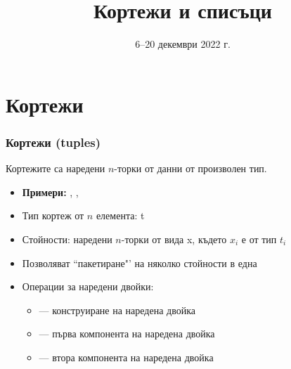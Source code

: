 \documentclass[alsotrans]{beamerswitch}
\title{Кортежи и списъци}
\date{6--20 декември 2022 г.}
\begin{document}
\begin{frame}
  \titlepage
\end{frame}
\section{Кортежи}

\begin{frame}
  \frametitle{Кортежи (tuples)}

  Кортежите са наредени $n$-торки от данни от произволен тип.
  \begin{itemize}[<+->]
  \item \textbf{Примери:} , , 
  \item Тип кортеж от $n$ елемента: \tuple t
  \item Стойности: наредени $n$-торки от вида \tuple x, където $x_i$ е от тип $t_i$
  \item Позволяват ``пакетиране"' на няколко стойности в една
  \item Операции за наредени двойки:
    \begin{itemize}
    \item {} --- конструиране на наредена двойка
    \item {} --- първа компонента на наредена двойка
    \item {} --- втора компонента на наредена двойка
    \end{itemize}
  \end{itemize}
\end{frame}
\end{document}
